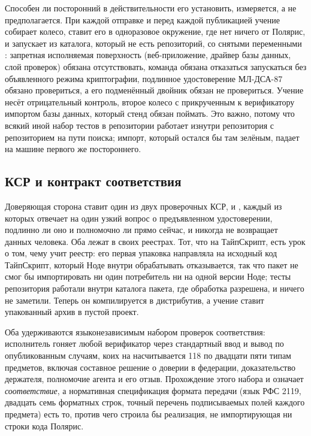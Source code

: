 Способен ли посторонний в действительности его установить, измеряется, а не предполагается. При
каждой отправке и перед каждой публикацией учение собирает колесо, ставит его в одноразовое
окружение, где нет ничего от Полярис, и запускает из каталога, который не есть репозиторий, со
снятыми переменными : запретная исполняемая поверхность (веб-приложение, драйвер
базы данных, слой проверок) обязана отсутствовать, команда обязана отказаться запускаться без
объявленного режима криптографии, подлинное удостоверение МЛ-ДСА-87 обязано провериться, а его
подменённый двойник обязан не провериться. Учение несёт отрицательный контроль, второе колесо с
прикрученным к верификатору импортом базы данных, который стенд обязан поймать. Это важно, потому
что всякий иной набор тестов в репозитории работает изнутри репозитория с репозиторием на пути
поиска; импорт, который остался бы там зелёным, падает на машине первого же постороннего. \sImpl

\subsection{КСР и контракт соответствия}

Доверяющая сторона ставит один из двух проверочных КСР,  и
, каждый из которых отвечает на один узкий вопрос о предъявленном
удостоверении, подлинно ли оно и полномочно ли прямо сейчас, и никогда не возвращает данных
человека. Оба лежат в своих реестрах. Тот, что на ТайпСкрипт, есть урок о том, чему учит реестр:
его первая упаковка направляла  на исходный код ТайпСкрипт, который Ноде внутри
 обрабатывать отказывается, так что пакет не смог бы импортировать ни один
потребитель ни на одной версии Ноде; тесты репозитория работали внутри каталога пакета, где
обработка разрешена, и ничего не заметили. Теперь он компилируется в дистрибутив, а учение ставит
упакованный архив в пустой проект. \sImpl

Оба удерживаются языконезависимым набором проверок соответствия: исполнитель гоняет любой
верификатор через стандартный ввод и вывод по опубликованным случаям, коих на 
насчитывается 118 по двадцати пяти типам предметов, включая составное решение о доверии в
федерации, доказательство держателя, полномочие агента и его отзыв. Прохождение этого набора и
означает \emph{соответствие}, а нормативная спецификация формата передачи (язык РФС 2119, двадцать
семь форматных строк, точный перечень подписываемых полей каждого предмета) есть то, против чего
строила бы реализация, не импортирующая ни строки кода Полярис. \sImpl

